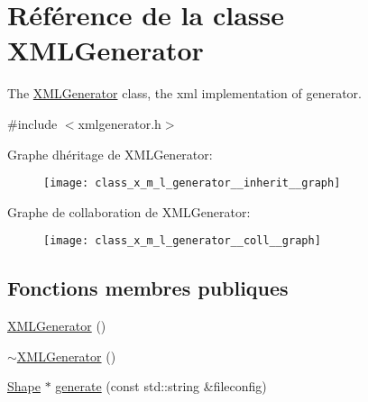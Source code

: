 \hypertarget{class_x_m_l_generator}{}\section{Référence de la classe X\+M\+L\+Generator}
\label{class_x_m_l_generator}


The \hyperlink{class_x_m_l_generator}{X\+M\+L\+Generator} class, the xml implementation of generator.  




{\ttfamily \#include $<$xmlgenerator.\+h$>$}



Graphe d\textquotesingle{}héritage de X\+M\+L\+Generator\+:\nopagebreak
\begin{figure}[H]
\begin{center}
\leavevmode
\texttt{[image: class\_x\_m\_l\_generator\_\_inherit\_\_graph]}
\end{center}
\end{figure}


Graphe de collaboration de X\+M\+L\+Generator\+:\nopagebreak
\begin{figure}[H]
\begin{center}
\leavevmode
\texttt{[image: class\_x\_m\_l\_generator\_\_coll\_\_graph]}
\end{center}
\end{figure}
\subsection*{Fonctions membres publiques}
\begin{DoxyCompactItemize}
\item 
\hyperlink{class_x_m_l_generator_ae88722c986a3d984f0050be10d69e6aa}{X\+M\+L\+Generator} ()
\item 
\hyperlink{class_x_m_l_generator_a8f947bac9f682ba5a22ccb98ff88ff81}{$\sim$\+X\+M\+L\+Generator} ()
\item 
\hyperlink{class_shape}{Shape} $\ast$ \hyperlink{class_x_m_l_generator_adf874b492da2e813980151c3453dd75c}{generate} (const std\+::string \&fileconfig)
\end{DoxyCompactItemize}
